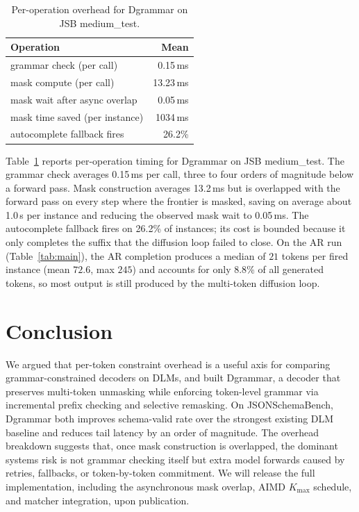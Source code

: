 \documentclass[11pt]{article}
\begin{document}
\begin{table}[!t]
\centering
\begin{tabular}{lr}
\toprule
\textbf{Operation} & \textbf{Mean} \\
\midrule
grammar check (per call)        & 0.15\,ms \\
mask compute (per call)         & 13.23\,ms \\
mask wait after async overlap   & 0.05\,ms \\
mask time saved (per instance)  & 1034\,ms \\
autocomplete fallback fires     & 26.2\% \\
\bottomrule
\end{tabular}
\caption{Per-operation overhead for Dgrammar on JSB medium\_test.}
\label{tab:overhead}
\end{table}

Table~\ref{tab:overhead} reports per-operation timing for Dgrammar on JSB medium\_test. The grammar check averages 0.15\,ms per call, three to four orders of magnitude below a forward pass. Mask construction averages 13.2\,ms but is overlapped with the forward pass on every step where the frontier is masked, saving on average about 1.0\,s per instance and reducing the observed mask wait to 0.05\,ms. The autocomplete fallback fires on 26.2\% of instances; its cost is bounded because it only completes the suffix that the diffusion loop failed to close. On the AR run (Table~\ref{tab:main}), the AR completion produces a median of $21$ tokens per fired instance (mean $72.6$, max $245$) and accounts for only $8.8$\% of all generated tokens, so most output is still produced by the multi-token diffusion loop.

\section{Conclusion}

We argued that per-token constraint overhead is a useful axis for comparing grammar-constrained decoders on DLMs, and built Dgrammar, a decoder that preserves multi-token unmasking while enforcing token-level grammar via incremental prefix checking and selective remasking. On JSONSchemaBench, Dgrammar both improves schema-valid rate over the strongest existing DLM baseline and reduces tail latency by an order of magnitude. The overhead breakdown suggests that, once mask construction is overlapped, the dominant systems risk is not grammar checking itself but extra model forwards caused by retries, fallbacks, or token-by-token commitment. We will release the full implementation, including the asynchronous mask overlap, AIMD $K_{\max}$ schedule, and matcher integration, upon publication.
\end{document}
